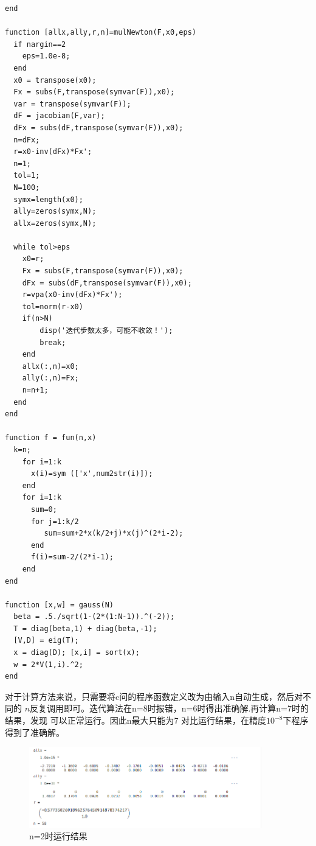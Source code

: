 \documentclass[12pt,a4paper,utf8]{ctexart}
\begin{document}
\begin{enumerate}
\begin{enumerate}
\begin{lstlisting}[frame=single]
end

function [allx,ally,r,n]=mulNewton(F,x0,eps)
  if nargin==2
    eps=1.0e-8;
  end
  x0 = transpose(x0);
  Fx = subs(F,transpose(symvar(F)),x0);
  var = transpose(symvar(F));
  dF = jacobian(F,var);
  dFx = subs(dF,transpose(symvar(F)),x0);
  n=dFx;
  r=x0-inv(dFx)*Fx';
  n=1;
  tol=1;
  N=100;
  symx=length(x0);
  ally=zeros(symx,N);
  allx=zeros(symx,N);

  while tol>eps
    x0=r;
    Fx = subs(F,transpose(symvar(F)),x0);
    dFx = subs(dF,transpose(symvar(F)),x0);
    r=vpa(x0-inv(dFx)*Fx');
    tol=norm(r-x0)
    if(n>N)
        disp('迭代步数太多，可能不收敛！');
        break;
    end
    allx(:,n)=x0;
    ally(:,n)=Fx;
    n=n+1;
  end
end

function f = fun(n,x)
  k=n;
    for i=1:k
      x(i)=sym (['x',num2str(i)]);
    end 
    for i=1:k
      sum=0;
      for j=1:k/2
         sum=sum+2*x(k/2+j)*x(j)^(2*i-2); 
      end
      f(i)=sum-2/(2*i-1);
    end
end

function [x,w] = gauss(N)
  beta = .5./sqrt(1-(2*(1:N-1)).^(-2));
  T = diag(beta,1) + diag(beta,-1);
  [V,D] = eig(T);
  x = diag(D); [x,i] = sort(x);
  w = 2*V(1,i).^2;
end
            \end{lstlisting}
                对于计算方法来说，只需要将c问的程序函数定义改为由输入n自动生成，然后对不同的
                $n$反复调用即可。迭代算法在n=8时报错，n=6时得出准确解.再计算n=7时的结果，发现
                可以正常运行。因此n最大只能为7
                对比运行结果，在精度$10^{-8}$下程序得到了准确解。
                \begin{figure}[h]
                    \centering
                    \includegraphics[width=0.9\textwidth]{H3T3D1.png}
                    \caption{n=2时运行结果}
               \end{figure}\\
               
        \end{enumerate}



\end{enumerate}
\end{document}
